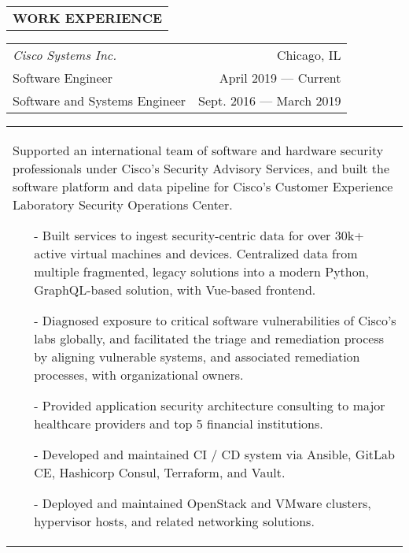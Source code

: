 \begin{tabularx}{\textwidth}{L}
    \textbf{WORK EXPERIENCE}
\end{tabularx}

\begin{tabularx}{\textwidth}{L R}
    \normalsize\textit{Cisco Systems Inc.} & Chicago, IL \\
    \hspace{10pt}Software Engineer & April 2019 --- Current \\
    \hspace{10pt}Software and Systems Engineer & Sept. 2016 --- March 2019 \\
\end{tabularx}
\begin{tabularx}{\textwidth}{X}
    \vspace{1pt}
    Supported an international team of software and hardware security professionals under Cisco's Security Advisory Services, and built the software platform and data pipeline for Cisco's Customer Experience Laboratory Security Operations Center.
    \begin{itemize}
        \itemsep{}
        \item[-] Built services to ingest security-centric data for over 30k+ active virtual machines and devices. Centralized data from multiple fragmented, legacy solutions into a modern Python, GraphQL-based solution, with Vue-based frontend.
        \item[-] Diagnosed exposure to critical software vulnerabilities of Cisco's labs globally, and facilitated the triage and remediation process by aligning vulnerable systems, and associated remediation processes, with organizational owners.
        \item[-] Provided application security architecture consulting to major healthcare providers and top 5 financial institutions.
        \item[-] Developed and maintained CI / CD system via Ansible, GitLab CE, Hashicorp Consul, Terraform, and Vault.
        \item[-] Deployed and maintained OpenStack and VMware clusters, hypervisor hosts, and related networking solutions.
    \end{itemize}
\end{tabularx}


